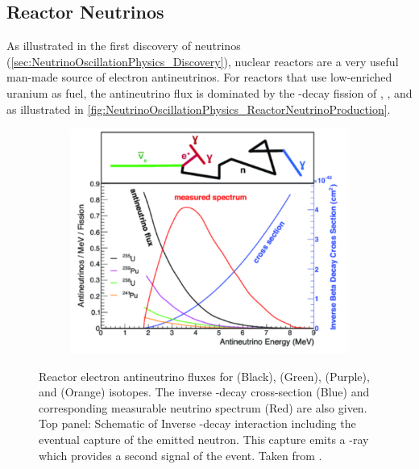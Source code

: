 \subsection{Reactor Neutrinos}
\label{subsec:NeutrinoOscillationPhysics_ReactorNeutrinos}

As illustrated in the first discovery of neutrinos (\autoref{sec:NeutrinoOscillationPhysics_Discovery}), nuclear reactors are a very useful man-made source of electron antineutrinos. For reactors that use low-enriched uranium  as fuel, the antineutrino flux is dominated by the \quickmath{\beta}-decay fission of , ,  and  \cite{Kim2013-ye} as illustrated in \autoref{fig:NeutrinoOscillationPhysics_ReactorNeutrinoProduction}.

\begin{figure}[h]
  \begin{subfigure}[t]{0.90\textwidth}
    \includegraphics[width=\textwidth, trim={0mm 0mm 0mm 0mm}, clip,page=1]{Figures/Theory/ReactorNeutrinoProduction.pdf}
  \end{subfigure}
  \caption{Reactor electron antineutrino fluxes for  (Black),  (Green),  (Purple), and  (Orange) isotopes. The inverse \quickmath{\beta}-decay cross-section (Blue) and corresponding measurable neutrino spectrum (Red) are also given. Top panel: Schematic of Inverse \quickmath{\beta}-decay interaction including the eventual capture of the emitted neutron. This capture emits a \quickmath{\gamma}-ray which provides a second signal of the event. Taken from \cite{SajjadAthar:2021prg}.}
  \label{fig:NeutrinoOscillationPhysics_ReactorNeutrinoProduction}
\end{figure}

